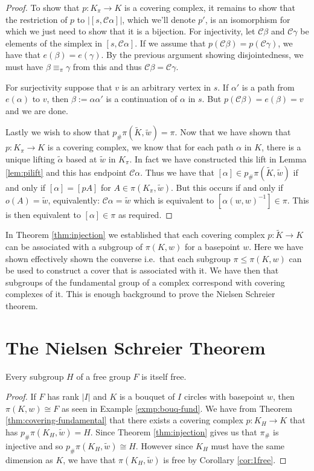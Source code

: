 \begin{proof}
  To show that $p:K_{\pi}\rightarrow K$ is a covering complex, it remains to show that the restriction of $p$ to $|[s,\mathcal{C}\alpha]|$, which we'll denote $p'$, is an isomorphism for which we just need to show that it is a bijection. For injectivity, let $\mathcal{C}\beta$ and $\mathcal{C}\gamma$ be elements of the simplex in $[s,\mathcal{C}\alpha]$. If we assume that $p(\mathcal{C}\beta) = p(\mathcal{C}\gamma)$, we have that $e(\beta) = e(\gamma)$. By the previous argument showing disjointedness, we must have $\beta \equiv_\pi \gamma$ from this and thus $\mathcal{C}\beta = \mathcal{C}\gamma$.

  For surjectivity suppose that $v$ is an arbitrary vertex in $s$. If $\alpha'$ is a path from $e(\alpha)$ to $v$, then $\beta := \alpha\alpha'$ is a continuation of $\alpha$ in $s$. But $p(\mathcal{C}\beta) = e(\beta) = v$ and we are done.

  Lastly we wish to show that $p_{\#}\pi(\tilde{K},\tilde{w}) = \pi$. Now that we have shown that $p:K_{\pi}\rightarrow K$ is a covering complex, we know that for each path $\alpha$ in $K$, there is a unique lifting $\tilde{\alpha}$ based at $\tilde{w}$ in $K_{\pi}$. In fact we have constructed this lift in Lemma \ref{lem:pilift} and this has endpoint $\mathcal{C}\alpha$. Thus we have that $[\alpha] \in p_{\#}\pi(\tilde{K},\tilde{w})$ if and only if $[\alpha] = [pA]$ for $A \in \pi(K_\pi,\tilde{w})$. But this occurs if and only if $o(A) = \tilde{w}$, equivalently: $\mathcal{C}\alpha = \tilde{w}$ which is equivalent to $[\alpha(w,w)^{-1}] \in \pi$. This is then equivalent to $[\alpha] \in \pi$ as required.
\end{proof}

In Theorem \ref{thm:injection} we established that each covering complex $p:\tilde{K} \rightarrow K$ can be associated with a subgroup of $\pi(K,w)$ for a basepoint $w$. Here we have shown effectively shown the converse i.e.\ that each subgroup $\pi \leq \pi(K,w)$ can be used to construct a cover that is associated with it. We have then that subgroups of the fundamental group of a complex correspond with covering complexes of it. This is enough background to prove the Nielsen Schreier theorem.

\section{The Nielsen Schreier Theorem}
\begin{theorem}\label{thm:ns}
  Every subgroup $H$ of a free group $F$ is itself free.
\end{theorem}
\begin{proof}
  If $F$ has rank $|I|$ and $K$ is a bouquet of $I$ circles with basepoint $w$, then $\pi(K,w) \cong F$ as seen in Example \ref{exmp:bouq-fund}. We have from Theorem \ref{thm:covering-fundamental} that there exists a covering complex $p:K_H \rightarrow K$ that has $p_{\#}\pi(K_H,\tilde{w}) = H$. Since Theorem \ref{thm:injection} gives us that $\pi_{\#}$ is injective and so $p_{\#}\pi(K_H,\tilde{w}) \cong H$. However since $K_H$ must have the same dimension as $K$, we have that $\pi(K_H,\tilde{w})$ is free by Corollary \ref{cor:1free}.
\end{proof}

